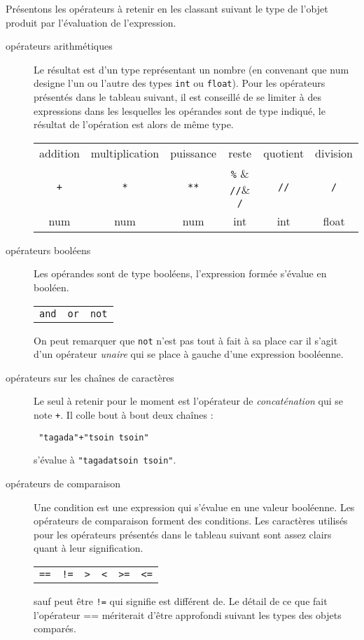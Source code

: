 Présentons les opérateurs à retenir en les classant suivant le type de l'objet produit par l'évaluation de l'expression.
\begin{description}
 \item[opérateurs arithmétiques] Le résultat est d'un type représentant un nombre (en convenant que num designe l'un ou l'autre des types \verb|int| ou \verb|float|). Pour les opérateurs présentés dans le tableau suivant, il est conseillé de se limiter à des expressions dans les lesquelles les opérandes sont de type indiqué, le résultat de l'opération est alors de même type.
 {%
\begin{center}
\begin{tabular}{cccccc}
addition & multiplication & puissance & reste & quotient & division \\
\verb|+| & \verb|*| & \verb|**| & \verb|%| & \verb|//|& \verb|/|    \\
num      & num      & num       & int      & int      & float    \\
 \end{tabular}
 \end{center}
}%

\item[opérateurs booléens] Les opérandes sont de type booléens, l'expression formée s'évalue en booléen. 
\begin{center}
\begin{tabular}{ccc}
\verb|and| & \verb|or| & \verb|not| \\
 \end{tabular}
\end{center}
On peut remarquer que \verb|not| n'est pas tout à fait à sa place car il s'agit d'un opérateur \emph{unaire} qui se place à gauche d'une expression booléenne.

\item[opérateurs sur les chaînes de caractères] Le seul à retenir pour le moment est l'opérateur de \emph{concaténation}  qui se note \verb|+|.\newline
Il colle bout à bout deux chaînes :
\begin{verbatim}
 "tagada"+"tsoin tsoin"
\end{verbatim}
s'évalue à \verb|"tagadatsoin tsoin"|.

\item[opérateurs de comparaison] Une condition est une expression qui s'évalue en une valeur booléenne. Les opérateurs de comparaison forment des conditions. Les caractères utilisés pour les opérateurs présentés dans le tableau suivant sont assez clairs quant à leur signification. 
{%
\begin{center}
\begin{tabular}{cccccc}
\verb|==|  & \verb|!=| & \verb|>|  & \verb|<|  & \verb|>=|  &  \verb|<=|
 \end{tabular}
 \end{center}
}
sauf peut être \verb|!=| qui signifie \og est différent de\fg. Le détail de ce que fait l'opérateur == mériterait d'être approfondi suivant les types des objets comparés.


\end{description}
